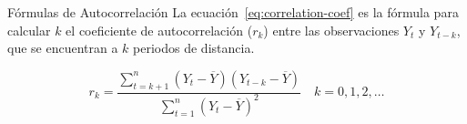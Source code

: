 \begin{frame}{Fórmulas de Autocorrelación}
  La ecuación~\ref{eq:correlation-coef} es la fórmula para calcular $k$ el coeficiente de autocorrelación ($r_k$) entre las
observaciones $Y_t$ y $Y_{t-k}$, que se encuentran a $k$ periodos de distancia.

  \begin{equation}
    \label{eq:correlation-coef}
    r_k =  \frac{\displaystyle\sum_{t=k+1}^{n} (Y_t - \overline{Y})(Y_{t-k} - \overline{Y})}{\displaystyle\sum_{t=1}^{n}(Y_{t} - \overline{Y})^{2}} \quad k=0,1,2,\ldots
  \end{equation}
\end{frame}

